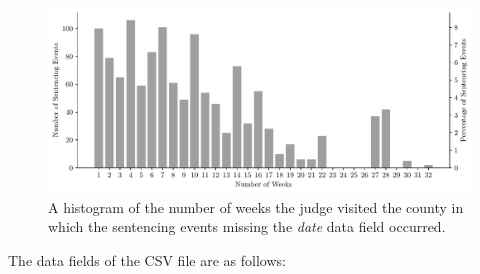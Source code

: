 \documentclass[11pt, oneside]{article}   	%
\theoremstyle{ModifiedStyle}
\begin{document}
\begin{figure}[H]
	\centering
	\includegraphics[scale=0.75]{Figures/Missing_Date_Histogram_of_Potential_Week_Histogram}
	\vspace{-2mm}
	\caption{A histogram of the number of weeks the judge visited the county in which the sentencing events missing the \emph{date} data field occurred.}
	\label{Figure_Missing_Date_Histogram_of_Potential_Week_Histogram}
\end{figure}

\noindent The data fields of the CSV file are as follows:
\end{document}
